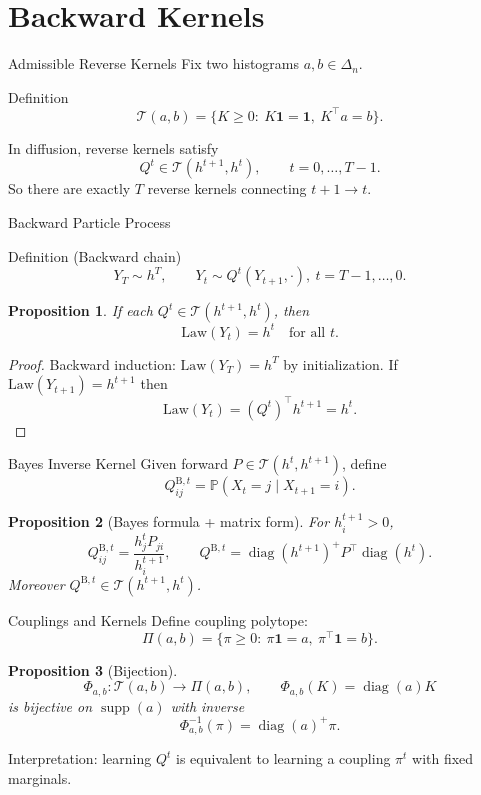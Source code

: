 \documentclass[aspectratio=169,11pt]{beamer}
\newcommand{\ones}{\mathbf{1}}
\newcommand{\diag}{\operatorname{diag}}
\newcommand{\Tset}{\mathcal{T}}
\newcommand{\Piset}{\Pi}
\newtheorem{proposition}{Proposition}
\begin{document}
\section{Backward Kernels}

\begin{frame}{Admissible Reverse Kernels}
Fix two histograms $a,b\in\Delta_n$.

\begin{block}{Definition}
\[
\Tset(a,b)=\{K\ge 0:\ K\ones=\ones,\ K^\top a=b\}.
\]
\end{block}

In diffusion, reverse kernels satisfy
\[
Q^t\in\Tset(h^{t+1},h^t),\qquad t=0,\dots,T-1.
\]
So there are exactly $T$ reverse kernels connecting $t+1\to t$.
\end{frame}

\begin{frame}{Backward Particle Process}
\begin{block}{Definition (Backward chain)}
\[
Y_T\sim h^T,\qquad Y_t\sim Q^t(Y_{t+1},\cdot),\ t=T-1,\dots,0.
\]
\end{block}

\begin{proposition}
If each $Q^t\in\Tset(h^{t+1},h^t)$, then
\[
\mathrm{Law}(Y_t)=h^t\quad\text{for all }t.
\]
\end{proposition}
\begin{proof}
Backward induction:
$\mathrm{Law}(Y_T)=h^T$ by initialization.
If $\mathrm{Law}(Y_{t+1})=h^{t+1}$ then
\[
\mathrm{Law}(Y_t)=(Q^t)^\top h^{t+1}=h^t.
\]
\end{proof}
\end{frame}

\begin{frame}{Bayes Inverse Kernel}
Given forward $P\in\Tset(h^t,h^{t+1})$, define
\[
Q^{\mathrm B,t}_{ij}=\mathbb P(X_t=j\mid X_{t+1}=i).
\]

\begin{proposition}[Bayes formula + matrix form]
For $h^{t+1}_i>0$,
\[
Q^{\mathrm B,t}_{ij}=\frac{h_j^tP_{ji}}{h_i^{t+1}},
\qquad
Q^{\mathrm B,t}=\diag(h^{t+1})^+P^\top\diag(h^t).
\]
Moreover $Q^{\mathrm B,t}\in\Tset(h^{t+1},h^t)$.
\end{proposition}
\end{frame}

\begin{frame}{Couplings and Kernels}
Define coupling polytope:
\[
\Piset(a,b)=\{\pi\ge 0:\ \pi\ones=a,\ \pi^\top\ones=b\}.
\]

\begin{proposition}[Bijection]
\[
\Phi_{a,b}:\Tset(a,b)\to\Piset(a,b),\qquad \Phi_{a,b}(K)=\diag(a)K
\]
is bijective on $\operatorname{supp}(a)$ with inverse
\[
\Phi_{a,b}^{-1}(\pi)=\diag(a)^+\pi.
\]
\end{proposition}

\vspace{0.3em}
Interpretation: learning $Q^t$ is equivalent to learning a coupling $\pi^t$ with fixed marginals.
\end{frame}
\end{document}
